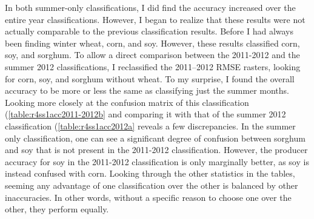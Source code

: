 
In both summer-only classifications, I did find the accuracy increased over the entire year classifications. However, I began to realize that these results were not actually comparable to the previous classification results. Before I had always been finding winter wheat, corn, and soy. However, these results classified corn, soy, and sorghum. To allow a direct comparison between the 2011-2012 and the summer 2012 classifications, I reclassified the 2011--2012 RMSE rasters, looking for corn, soy, and sorghum without wheat. To my surprise, I found the overall accuracy to be more or less the same as classifying just the summer months. Looking more closely at the confusion matrix of this classification (\cref{table:r4ss1acc2011-2012b} and comparing it with that of the summer 2012 classification (\cref{table:r4ss1acc2012a} reveals a few discrepancies. In the summer only classification, one can see a significant degree of confusion between sorghum and soy that is not present in the 2011-2012 classification. However, the producer accuracy for soy in the 2011-2012 classification is only marginally better, as soy is instead confused with corn. Looking through the other statistics in the tables, seeming any advantage of one classification over the other is balanced by other inaccuracies. In other words, without a specific reason to choose one over the other, they perform equally.


